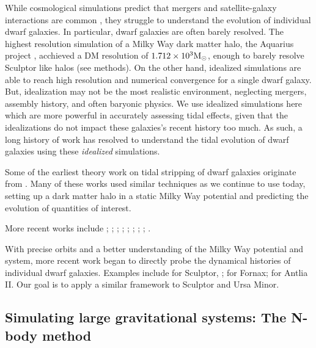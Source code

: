 While cosmological simulations predict that mergers and satellite-galaxy
interactions are common \citep[e.g.,][]{riley+2024}, they struggle to
understand the evolution of individual dwarf galaxies. In particular,
dwarf galaxies are often barely resolved. The highest resolution
simulation of a Milky Way dark matter halo, the Aquarius project
\citep{springel+2008}, acchieved a DM resolution of
\(1.712 \times10^3 {\rm M}_{\odot}\), enough to barely resolve Sculptor like halos
(see methods). On the other hand, idealized simulations are able to
reach high resolution and numerical convergence for a single dwarf
galaxy. But, idealization may not be the most realistic environment,
neglecting mergers, assembly history, and often baryonic physics. We use
idealized simulations here which are more powerful in accurately
assessing tidal effects, given that the idealizations do not impact
these galaxies's recent history too much. As such, a long history of
work has resolved to understand the tidal evolution of dwarf galaxies
using these \emph{idealized} simulations.

Some of the earliest theory work on tidal stripping of dwarf galaxies
originate from
\citep{allen+richstone1988, moore+davis1994, johnston+spergel+hernquist1995, oh+lin+aarseth1995, piatek+pryor1995, velazquez+white1995, kroupa1997, pryor1996}.
Many of these works used similar techniques as we continue to use today,
setting up a dark matter halo in a static Milky Way potential and
predicting the evolution of quantities of interest.

More recent works include \citet{read+2006};
\citet{bullock+johnston2005}; \citet{PNM2008}; \citet{penarrubia+2009};
\citet{klimentowski+2009}; \citet{errani+2023a}; \citet{fattahi+2018};
\citet{stucker+2023}; \citet{wang+2017}.

With precise orbits and a better understanding of the Milky Way
potential and system, more recent work began to directly probe the
dynamical histories of individual dwarf galaxies. Examples include
\citet{iorio+2019} for Sculptor, \citet{borukhovetskaya+2022};
\citet{dicintio+2024} for Fornax; \citet{borukhovetskaya+2022a} for
Antlia II. Our goal is to apply a similar framework to Sculptor and Ursa
Minor.

\subsection{Simulating large gravitational systems: The N-body
method}\label{simulating-large-gravitational-systems-the-n-body-method}


